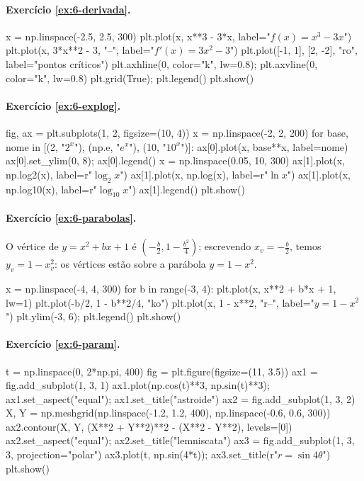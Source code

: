 \paragraph{Exercício \ref{ex:6-derivada}.}
\begin{entrada}
x = np.linspace(-2.5, 2.5, 300)
plt.plot(x, x**3 - 3*x, label="$f(x)=x^3-3x$")
plt.plot(x, 3*x**2 - 3, "--", label="$f'(x)=3x^2-3$")
plt.plot([-1, 1], [2, -2], "ro", label="pontos críticos")
plt.axhline(0, color="k", lw=0.8); plt.axvline(0, color="k", lw=0.8)
plt.grid(True); plt.legend()
plt.show()
\end{entrada}

\paragraph{Exercício \ref{ex:6-explog}.}
\begin{entrada}
fig, ax = plt.subplots(1, 2, figsize=(10, 4))
x = np.linspace(-2, 2, 200)
for base, nome in [(2, "$2^x$"), (np.e, "$e^x$"), (10, "$10^x$")]:
    ax[0].plot(x, base**x, label=nome)
ax[0].set_ylim(0, 8); ax[0].legend()
x = np.linspace(0.05, 10, 300)
ax[1].plot(x, np.log2(x), label=r"$\log_2 x$")
ax[1].plot(x, np.log(x), label=r"$\ln x$")
ax[1].plot(x, np.log10(x), label=r"$\log_{10} x$")
ax[1].legend()
plt.show()
\end{entrada}

\paragraph{Exercício \ref{ex:6-parabolas}.} O vértice de $y=x^2+bx+1$ é $\left(-\frac b2, 1-\frac{b^2}{4}\right)$;
escrevendo $x_v=-\frac b2$, temos $y_v=1-x_v^2$: os vértices estão sobre a parábola $y=1-x^2$.
\begin{entrada}
x = np.linspace(-4, 4, 300)
for b in range(-3, 4):
    plt.plot(x, x**2 + b*x + 1, lw=1)
    plt.plot(-b/2, 1 - b**2/4, "ko")
plt.plot(x, 1 - x**2, "r--", label="$y = 1 - x^2$")
plt.ylim(-3, 6); plt.legend()
plt.show()
\end{entrada}

\paragraph{Exercício \ref{ex:6-param}.}
\begin{entrada}
t = np.linspace(0, 2*np.pi, 400)
fig = plt.figure(figsize=(11, 3.5))
ax1 = fig.add_subplot(1, 3, 1)
ax1.plot(np.cos(t)**3, np.sin(t)**3); ax1.set_aspect("equal"); ax1.set_title("astroide")
ax2 = fig.add_subplot(1, 3, 2)
X, Y = np.meshgrid(np.linspace(-1.2, 1.2, 400), np.linspace(-0.6, 0.6, 300))
ax2.contour(X, Y, (X**2 + Y**2)**2 - (X**2 - Y**2), levels=[0])
ax2.set_aspect("equal"); ax2.set_title("lemniscata")
ax3 = fig.add_subplot(1, 3, 3, projection="polar")
ax3.plot(t, np.sin(4*t)); ax3.set_title(r"$r = \sin 4\theta$")
plt.show()
\end{entrada}

